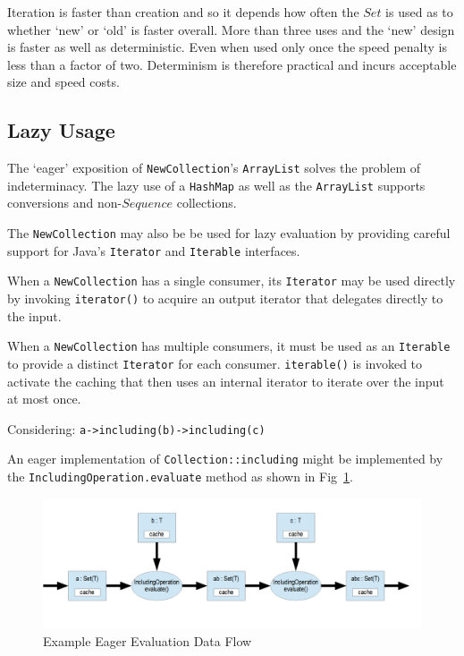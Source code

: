 \documentclass{llncs}
\begin{document}
Iteration is faster than creation and so it depends how often the $Set$ is used as to whether `new' or `old' is faster overall. More than three uses and the `new' design is faster as well as deterministic. Even when used only once the speed penalty is less than a factor of two. Determinism is therefore practical and incurs acceptable size and speed costs. 

\subsection{Lazy Usage}

The `eager' exposition of \verb$NewCollection$'s \verb$ArrayList$ solves the problem of indeterminacy. The lazy use of a \verb$HashMap$ as well as the \verb$ArrayList$ supports conversions and non-$Sequence$ collections.

The \verb$NewCollection$ may also be be used for lazy evaluation by providing careful support for Java's \verb$Iterator$ and \verb$Iterable$ interfaces.

When a \verb$NewCollection$ has a single consumer, its \verb$Iterator$ may be used directly by invoking \verb$iterator()$ to acquire an output iterator that delegates directly to the input.

When a \verb$NewCollection$ has multiple consumers, it must be used as an \verb$Iterable$ to provide a distinct \verb$Iterator$ for each consumer. \verb$iterable()$ is invoked to activate the caching that then uses an internal iterator to iterate over the input at most once.

Considering: \verb$a->including(b)->including(c)$

An eager implementation of \verb$Collection::including$ might be implemented by the \verb$IncludingOperation.evaluate$ method as shown in Fig~\ref{fig:EagerExample}. 

\begin{figure}
	\begin{center}
		\includegraphics[width=4.5in]{EagerExample.png}
	\end{center}
	\caption{Example Eager Evaluation Data Flow}
	\label{fig:EagerExample}
\end{figure}
\end{document}
